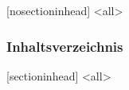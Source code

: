 
%
%
  [nosectioninhead]
\mode<all>
\begin{frame}
  \frametitle{Inhaltsverzeichnis}
  \flushcolumns %
  \setlength{\columnsep}{0.2cm}%
  \begin{multicols}{2}
    \tableofcontents[hideallsubsections]
  \end{multicols}
\end{frame}
  [sectioninhead]
\mode<all>

%
%
